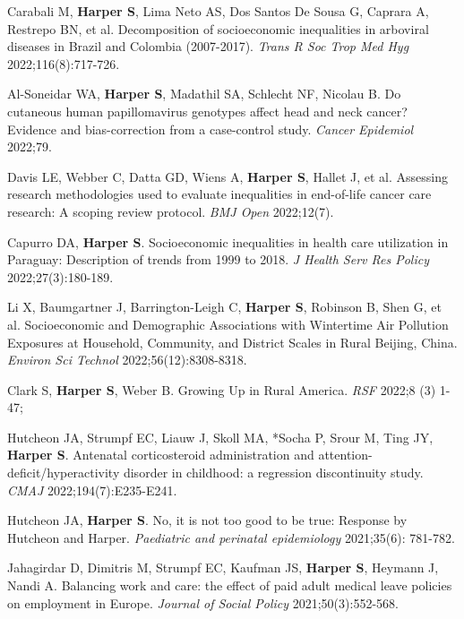 \documentclass[
  letterpaper,
  DIV=11,
  numbers=noendperiod]{scrartcl}
\begin{document}
\begin{etaremune}
\item Carabali M, \textbf{Harper S}, Lima Neto AS, Dos Santos De Sousa G, Caprara A, Restrepo BN, et al. Decomposition of socioeconomic inequalities in arboviral diseases in Brazil and Colombia (2007-2017). \emph{Trans R Soc Trop Med Hyg} 2022;116(8):717-726.

\item *Al-Soneidar WA, \textbf{Harper S}, Madathil SA, Schlecht NF, Nicolau B. Do cutaneous human papillomavirus genotypes affect head and neck cancer? Evidence and bias-correction from a case-control study. \emph{Cancer Epidemiol} 2022;79.

\item Davis LE, Webber C, Datta GD, Wiens A, \textbf{Harper S}, Hallet J, et al. Assessing research methodologies used to evaluate inequalities in end-of-life cancer care research: A scoping review protocol. \emph{BMJ Open} 2022;12(7).

\item *Capurro DA, \textbf{Harper S}. Socioeconomic inequalities in health care utilization in Paraguay: Description of trends from 1999 to 2018. \emph{J Health Serv Res Policy} 2022;27(3):180-189.

\item Li X, Baumgartner J, Barrington-Leigh C, \textbf{Harper S}, Robinson B, Shen G, et al. Socioeconomic and Demographic Associations with Wintertime Air Pollution Exposures at Household, Community, and District Scales in Rural Beijing, China. \emph{Environ Sci Technol} 2022;56(12):8308-8318.

\item Clark S, \textbf{Harper S}, Weber B. Growing Up in Rural America. \emph{RSF} 2022;8 (3) 1-47; 

\item Hutcheon JA, Strumpf EC, Liauw J, Skoll MA, *Socha P, Srour M, Ting JY, \textbf{Harper S}. Antenatal corticosteroid administration and attention-deficit/hyperactivity disorder in childhood: a regression discontinuity study. \emph{CMAJ} 2022;194(7):E235-E241.

\item Hutcheon JA, \textbf{Harper S}. No, it is not too good to be true: Response by Hutcheon and Harper. \emph{Paediatric and perinatal epidemiology} 2021;35(6): 781-782.

\item Jahagirdar D, Dimitris M, Strumpf EC, Kaufman JS, \textbf{Harper S}, Heymann J, Nandi A. Balancing work and care: the effect of paid adult medical leave policies on employment in Europe. \emph{Journal of Social Policy} 2021;50(3):552-568.


\end{etaremune}
\end{document}
